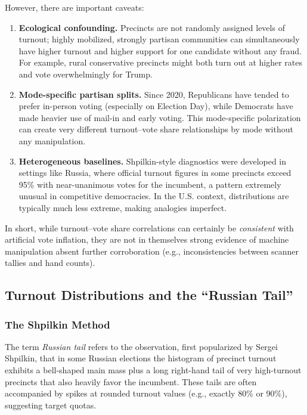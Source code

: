 \documentclass[12pt]{article}
\begin{document}
However, there are important caveats:

\begin{enumerate}
    \item \textbf{Ecological confounding.} Precincts are not randomly assigned levels of turnout; highly mobilized, strongly partisan communities can simultaneously have higher turnout and higher support for one candidate without any fraud. For example, rural conservative precincts might both turn out at higher rates and vote overwhelmingly for Trump.

    \item \textbf{Mode-specific partisan splits.} Since 2020, Republicans have tended to prefer in-person voting (especially on Election Day), while Democrats have made heavier use of mail-in and early voting. This mode-specific polarization can create very different turnout--vote share relationships by mode without any manipulation.

    \item \textbf{Heterogeneous baselines.} Shpilkin-style diagnostics were developed in settings like Russia, where official turnout figures in some precincts exceed 95\% with near-unanimous votes for the incumbent, a pattern extremely unusual in competitive democracies. In the U.S. context, distributions are typically much less extreme, making analogies imperfect.
\end{enumerate}

In short, while turnout--vote share correlations can certainly be \emph{consistent} with artificial vote inflation, they are not in themselves strong evidence of machine manipulation absent further corroboration (e.g., inconsistencies between scanner tallies and hand counts).

\subsection{Turnout Distributions and the ``Russian Tail''}

\subsubsection{The Shpilkin Method}

The term \emph{Russian tail} refers to the observation, first popularized by Sergei Shpilkin, that in some Russian elections the histogram of precinct turnout exhibits a bell-shaped main mass plus a long right-hand tail of very high-turnout precincts that also heavily favor the incumbent. These tails are often accompanied by spikes at rounded turnout values (e.g., exactly 80\% or 90\%), suggesting target quotas.
\end{document}

